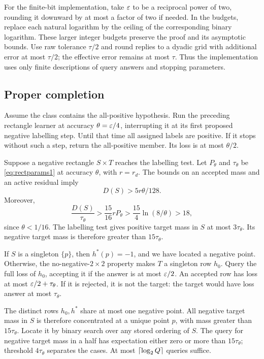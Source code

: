 For the finite-bit implementation, take $\varepsilon$ to be a reciprocal power of two, rounding it downward by at most a factor of two if needed. In the budgets, replace each natural logarithm by the ceiling of the corresponding binary logarithm. These larger integer budgets preserve the proof and its asymptotic bounds. Use raw tolerance $\tau/2$ and round replies to a dyadic grid with additional error at most $\tau/2$; the effective error remains at most $\tau$. Thus the implementation uses only finite descriptions of query answers and stopping parameters.

\subsection{Proper completion}
Assume the class contains the all-positive hypothesis. Run the preceding rectangle learner at accuracy $\theta=\varepsilon/4$, interrupting it at its first proposed negative labelling step. Until that time all assigned labels are positive. If it stops without such a step, return the all-positive member. Its loss is at most $\theta/2$.

Suppose a negative rectangle $S\times T$ reaches the labelling test. Let $P_\theta$ and $\tau_\theta$ be \eqref{eq:rectparams1} at accuracy $\theta$, with $r=r_d$. The bounds on an accepted mass and an active residual imply
\[
 D(S)>5r\theta/128.
\]
Moreover,
\[
 \frac{D(S)}{\tau_\theta}
 >\frac{15}{16}rP_\theta
 >\frac{15}{4}\ln(8/\theta)>18,
\]
since $\theta<1/16$. The labelling test gives positive target mass in $S$ at most $3\tau_\theta$. Its negative target mass is therefore greater than $15\tau_\theta$.

If $S$ is a singleton $\{p\}$, then $h^*(p)=-1$, and we have located a negative point. Otherwise, the no-negative-$2\times2$ property makes $T$ a singleton row $h_0$. Query the full loss of $h_0$, accepting it if the answer is at most $\varepsilon/2$. An accepted row has loss at most $\varepsilon/2+\tau_\theta$. If it is rejected, it is not the target: the target would have loss answer at most $\tau_\theta$.

The distinct rows $h_0,h^*$ share at most one negative point. All negative target mass in $S$ is therefore concentrated at a unique point $p$, with mass greater than $15\tau_\theta$. Locate it by binary search over any stored ordering of $S$. The query for negative target mass in a half has expectation either zero or more than $15\tau_\theta$; threshold $4\tau_\theta$ separates the cases. At most $\lceil \log_2Q\rceil$ queries suffice.

